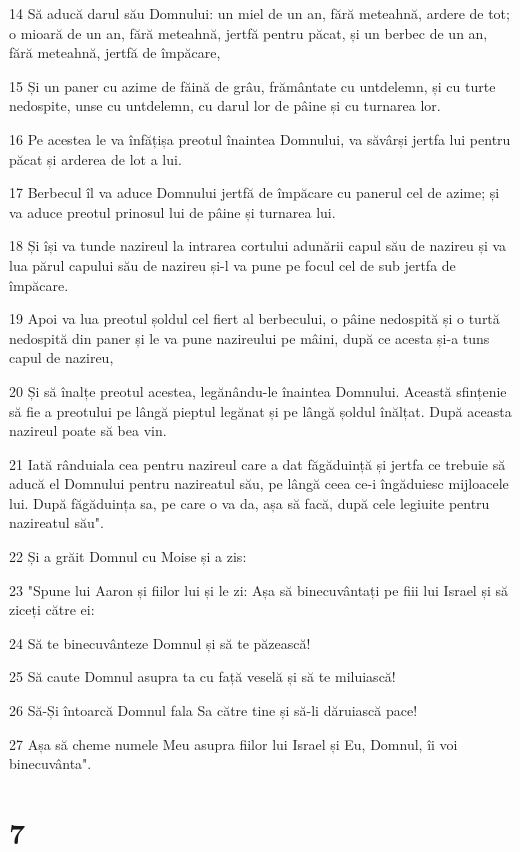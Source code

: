 \par 14 Să aducă darul său Domnului: un miel de un an, fără meteahnă, ardere de tot; o mioară de un an, fără meteahnă, jertfă pentru păcat, și un berbec de un an, fără meteahnă, jertfă de împăcare,
\par 15 Și un paner cu azime de făină de grâu, frământate cu untdelemn, și cu turte nedospite, unse cu untdelemn, cu darul lor de pâine și cu turnarea lor.
\par 16 Pe acestea le va înfățișa preotul înaintea Domnului, va săvârși jertfa lui pentru păcat și arderea de lot a lui.
\par 17 Berbecul îl va aduce Domnului jertfă de împăcare cu panerul cel de azime; și va aduce preotul prinosul lui de pâine și turnarea lui.
\par 18 Și își va tunde nazireul la intrarea cortului adunării capul său de nazireu și va lua părul capului său de nazireu și-l va pune pe focul cel de sub jertfa de împăcare.
\par 19 Apoi va lua preotul șoldul cel fiert al berbecului, o pâine nedospită și o turtă nedospită din paner și le va pune nazireului pe mâini, după ce acesta și-a tuns capul de nazireu,
\par 20 Și să înalțe preotul acestea, legănându-le înaintea Domnului. Această sfințenie să fie a preotului pe lângă pieptul legănat și pe lângă șoldul înălțat. După aceasta nazireul poate să bea vin.
\par 21 Iată rânduiala cea pentru nazireul care a dat făgăduință și jertfa ce trebuie să aducă el Domnului pentru nazireatul său, pe lângă ceea ce-i îngăduiesc mijloacele lui. După făgăduința sa, pe care o va da, așa să facă, după cele legiuite pentru nazireatul său".
\par 22 Și a grăit Domnul cu Moise și a zis:
\par 23 "Spune lui Aaron și fiilor lui și le zi: Așa să binecuvântați pe fiii lui Israel și să ziceți către ei:
\par 24 Să te binecuvânteze Domnul și să te păzească!
\par 25 Să caute Domnul asupra ta cu față veselă și să te miluiască!
\par 26 Să-Și întoarcă Domnul fala Sa către tine și să-li dăruiască pace!
\par 27 Așa să cheme numele Meu asupra fiilor lui Israel și Eu, Domnul, îi voi binecuvânta".

\chapter{7}

